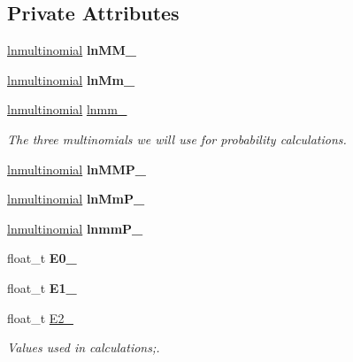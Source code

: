 \subsection*{Private Attributes}
\begin{DoxyCompactItemize}
\item 
\hypertarget{classmodels_a8366e06c832207001f9fa351315e92e5}{\hyperlink{classlnmultinomial}{lnmultinomial} {\bfseries ln\-M\-M\-\_\-}}\label{classmodels_a8366e06c832207001f9fa351315e92e5}

\item 
\hypertarget{classmodels_a1961bd182932816bf4c898f4aab78f35}{\hyperlink{classlnmultinomial}{lnmultinomial} {\bfseries ln\-Mm\-\_\-}}\label{classmodels_a1961bd182932816bf4c898f4aab78f35}

\item 
\hypertarget{classmodels_a006e767f301f845494ffabb72fdaae2c}{\hyperlink{classlnmultinomial}{lnmultinomial} \hyperlink{classmodels_a006e767f301f845494ffabb72fdaae2c}{lnmm\-\_\-}}\label{classmodels_a006e767f301f845494ffabb72fdaae2c}

\begin{DoxyCompactList}\small\item\em The three multinomials we will use for probability calculations. \end{DoxyCompactList}\item 
\hypertarget{classmodels_a7704b5b116e535792ad793c4196ad7b8}{\hyperlink{classlnmultinomial}{lnmultinomial} {\bfseries ln\-M\-M\-P\-\_\-}}\label{classmodels_a7704b5b116e535792ad793c4196ad7b8}

\item 
\hypertarget{classmodels_a29b19232203e76420ed3bd7a62e6303b}{\hyperlink{classlnmultinomial}{lnmultinomial} {\bfseries ln\-Mm\-P\-\_\-}}\label{classmodels_a29b19232203e76420ed3bd7a62e6303b}

\item 
\hypertarget{classmodels_aa41aca7f89f1b31aac86390a70f32b84}{\hyperlink{classlnmultinomial}{lnmultinomial} {\bfseries lnmm\-P\-\_\-}}\label{classmodels_aa41aca7f89f1b31aac86390a70f32b84}

\item 
\hypertarget{classmodels_a4e3600d74dd1d821d3883e7b1b865880}{float\-\_\-t {\bfseries E0\-\_\-}}\label{classmodels_a4e3600d74dd1d821d3883e7b1b865880}

\item 
\hypertarget{classmodels_ab9cbc7e63358457207a99e8f789e018b}{float\-\_\-t {\bfseries E1\-\_\-}}\label{classmodels_ab9cbc7e63358457207a99e8f789e018b}

\item 
\hypertarget{classmodels_a1dc72dc854b102c0b8024c2f43633d39}{float\-\_\-t \hyperlink{classmodels_a1dc72dc854b102c0b8024c2f43633d39}{E2\-\_\-}}\label{classmodels_a1dc72dc854b102c0b8024c2f43633d39}

\begin{DoxyCompactList}\small\item\em Values used in calculations;. \end{DoxyCompactList}\end{DoxyCompactItemize}


